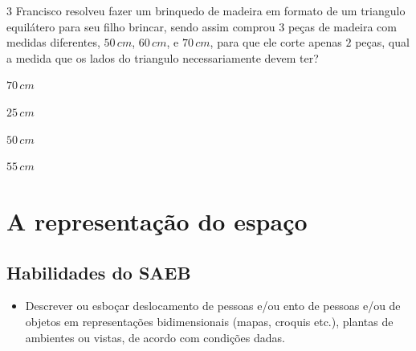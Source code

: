 \num{3}  Francisco resolveu fazer um brinquedo de madeira em formato de um
triangulo equilátero para seu filho brincar, sendo assim comprou $3$ peças
de madeira com medidas diferentes, $50\,cm$, $60\,cm$, e $70\,cm$, para que ele
corte apenas $2$ peças, qual a medida que os lados do triangulo
necessariamente devem ter?

\begin{escolha}
\item $70\,cm$
\item $25\,cm$
\item $50\,cm$
\item $55\,cm$
\end{escolha}



\chapter{A representação do espaço}

\section{Habilidades do SAEB} 
\begin{itemize}
\item Descrever ou esboçar deslocamento de pessoas e/ou
ento de pessoas e/ou de objetos em representações bidimensionais (mapas, croquis etc.),
plantas de ambientes ou vistas, de acordo com condições dadas.
\end{itemize}

